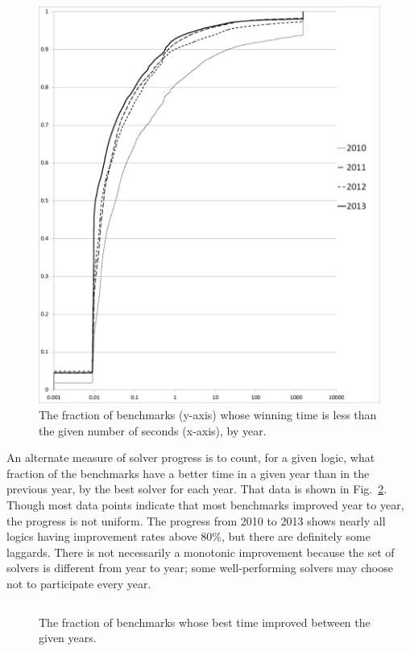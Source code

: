 \documentclass{eptcs}
\begin{document}
\begin{figure}
\centering
\includegraphics[width=.8\textwidth]{CumulativeTimes3}
\caption{The fraction of benchmarks (y-axis) whose winning time is less than the given number of seconds (x-axis), by year.}
\label{Fig:CumulativeTimes}
\end{figure}

An alternate measure of solver progress is to count, for a given logic, what fraction of the benchmarks have a better time in a given year than in the previous year, by the best solver for each year. That data is shown in Fig.~\ref{Fig:bettertime}. Though most data points indicate that most benchmarks improved year to year, the progress is not uniform. The progress from 2010 to 2013 shows nearly all logics having improvement rates above 80\%, but there are definitely some laggards. There is not necessarily a monotonic improvement because the set of solvers is different from year to year; some well-performing solvers may choose not to participate every year.

\begin{figure}
\centering
\begin{tabular}{|l|r|rrrr|}
\hline

\hline
\end{tabular}
\caption{The fraction of benchmarks whose best time improved between the given years.}
\label{Fig:bettertime}
\end{figure}
\end{document}
